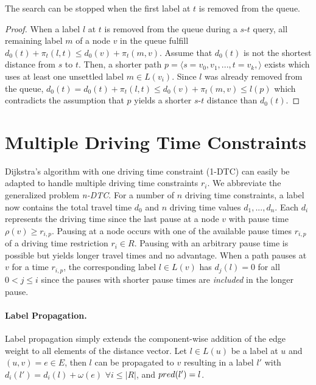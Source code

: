 \begin{theorem}\label{theorem:pot_stop_criterion}
	The search can be stopped when the first label at $t$ is removed from the queue.
\end{theorem}

\begin{proof}
	When a label $l$ at $t$ is removed from the queue during a $s$-$t$ query, all remaining label $m$ of a node $v$ in the queue fulfill $d_0(t) + \pi_t(l,t) \le d_0(v) + \pi_t(m,v)$. Assume that $d_0(t)$ is not the shortest distance from $s$ to $t$. Then, a shorter path $p = \langle s=v_0,v_1,...,t=v_k, \rangle$ exists which uses at least one unsettled label $m \in L(v_i)$. Since $l$ was already removed from the queue, $d_0(t) = d_0(t) + \pi_t(l,t) \le  d_0(v) + \pi_t(m,v) \le l(p)$ which contradicts the assumption that $p$ yields a shorter $s$-$t$ distance than $d_0(t)$.
\end{proof}

\section{Multiple Driving Time Constraints}
Dijkstra's algorithm with one driving time constraint (1-DTC) can easily be adapted to handle multiple driving time constraints $r_i$. We abbreviate the generalized problem \emph{n-DTC}. For a number of $n$ driving time constraints, a label now contains the total travel time $d_0$ and $n$ driving time values $d_1, ... , d_n$. Each $d_i$ represents the driving time since the last pause at a node $v$ with pause time $\rho(v) \ge r_{i,p}$. Pausing at a node occurs with one of the available pause times $r_{i,p}$ of a driving time restriction $r_i \in R$. Pausing with an arbitrary pause time is possible but yields longer travel times and no advantage. When a path pauses at $v$ for a time $r_{i,p}$, the corresponding label $l \in L(v)$ has $d_j(l) = 0$ for all $0 < j \le i$ since the pauses with shorter pause times are \emph{included} in the longer pause.

\paragraph{Label Propagation.}
Label propagation simply extends the component-wise addition of the edge weight to all elements of the distance vector. Let $l \in L(u)$ be a label at $u$ and $(u,v) = e \in E$, then $l$ can be propagated to $v$ resulting in a label $l'$ with $d_i(l') = d_i(l) + \omega(e)$ $\forall i \le |R|$, and $pred(l') = l$.

